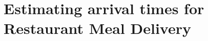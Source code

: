 \section{Estimating arrival times for Restaurant Meal Delivery}

























































































    
